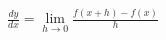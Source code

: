 \documentclass[preview]{standalone}
\begin{document}
\begin{align*}
\frac{dy}{dx} = \lim_{h \to 0} \frac{f(x+h) - f(x)}{h}
\end{align*}
\end{document}
